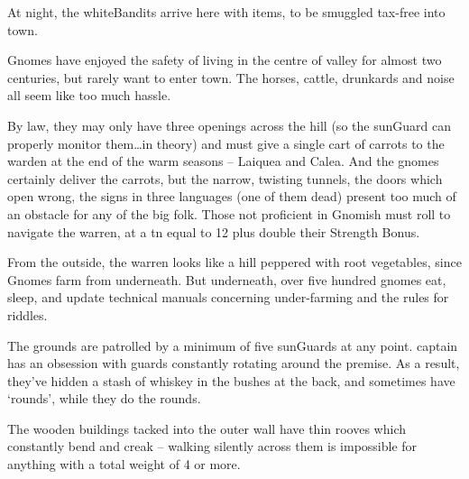 \begin{multicols}{2}
At night, the \gls{whiteBandits} arrive here with items, to be smuggled tax-free into \gls{town}.



Gnomes have enjoyed the safety of living in the centre of \gls{valley} for almost two centuries, but rarely want to enter \gls{town}.
The horses, cattle, drunkards and noise all seem like too much hassle.

By law, they may only have three openings across the hill (so the \gls{sunGuard} can properly monitor them\ldots in theory) and must give a single cart of carrots to the \gls{warden} at the end of the warm seasons -- Laiquea and Calea.
And the gnomes certainly deliver the carrots, but the narrow, twisting tunnels, the doors which open wrong, the signs in three languages (one of them dead) present too much of an obstacle for any of the big folk.
Those not proficient in Gnomish must roll  to navigate the warren, at a \gls{tn} equal to 12 plus double their Strength Bonus.

From the outside, the warren looks like a hill peppered with root vegetables, since Gnomes farm from underneath.%
But underneath, over five hundred gnomes eat, sleep, and update technical manuals concerning under-farming and the rules for riddles.


The grounds are patrolled by a minimum of five \glspl{sunGuard} at any point.
\Gls{captain} has an obsession with guards constantly rotating around the premise.
As a result, they've hidden a stash of whiskey in the bushes at the back, and sometimes have `rounds', while they do the rounds.

The wooden buildings tacked into the outer wall have thin rooves which constantly bend and creak -- walking silently across them is impossible for anything with a total \gls{weight} of 4 or more.




\end{multicols}
